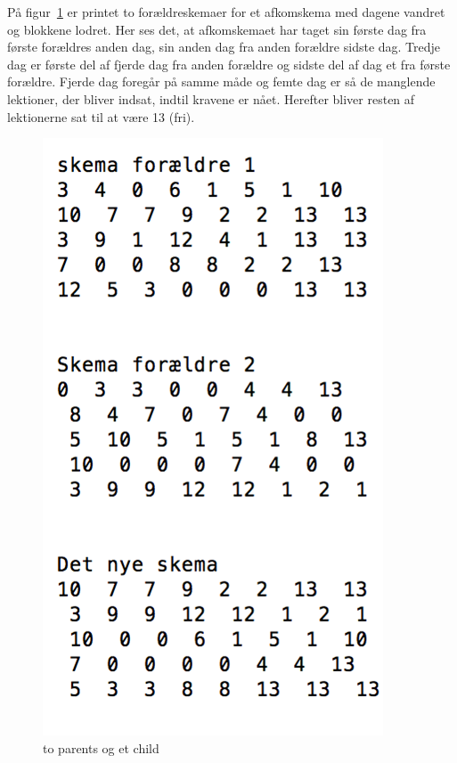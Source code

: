 På figur~\ref{fig:crossovertest} er printet to forældreskemaer for et afkomskema med dagene vandret og blokkene lodret. Her ses det, at afkomskemaet har taget sin første dag fra første forældres anden dag, sin anden dag fra anden forældre sidste dag. Tredje dag er første del af fjerde dag fra anden forældre og sidste del af dag et fra første forældre. Fjerde dag foregår på samme måde og femte dag er så de manglende lektioner, der bliver indsat, indtil kravene er nået. Herefter bliver resten af lektionerne sat til at være 13 (fri).

\begin{figure}[!h]
  \includegraphics[scale=0.8]{partials/graphics/crossovertest.png}
  \caption{to parents og et child}
  \label{fig:crossovertest}
\end{figure}
